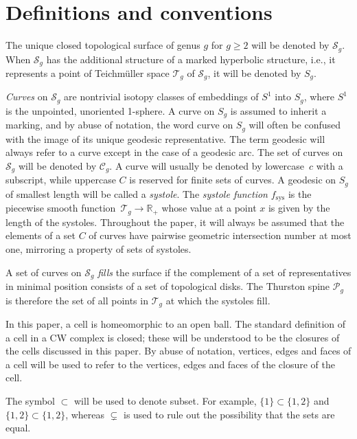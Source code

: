 \documentclass[pdftex]{sigma}
\numberwithin{equation}{section}
\begin{document}
\section{Definitions and conventions}
\label{sub:defns}

The unique closed topological surface of genus $g$ for $g\geq 2$ will be denoted by $\mathcal{S}_{g}$. When $\mathcal{S}_{g}$ has the additional structure of a marked hyperbolic structure, i.e., it represents a point of Teichm\"uller space $\mathcal{T}_{g}$ of $\mathcal{S}_{g}$, it will be denoted by $S_{g}$.

\textit{Curves} on $\mathcal{S}_{g}$ are nontrivial isotopy classes of embeddings of $S^{1}$ into $S_{g}$, where $S^{1}$ is the unpointed, unoriented 1-sphere. A curve on $S_{g}$ is assumed to inherit a marking, and by abuse of notation, the word curve on $S_{g}$ will often be confused with the image of its unique geodesic representative. The term geodesic will always refer to a curve except in the case of a geodesic arc. The set of curves on $\mathcal{S}_{g}$ will be denoted by $\mathcal{C}_{g}$. A curve will usually be denoted by lowercase~$c$ with a subscript, while uppercase $C$ is reserved for finite sets of curves. A geodesic on $S_{g}$ of smallest length will be called a \textit{systole}. The \textit{systole function} $f_{\mathrm{sys}}$ is the piecewise smooth function~${\mathcal{T}_{g}\rightarrow \mathbb{R}_{+}}$ whose value at a point $x$ is given by the length of the systoles. Throughout the paper, it will always be assumed that the elements of a set $C$ of curves have pairwise geometric intersection number at most one, mirroring a property of sets of systoles.

A set of curves on $\mathcal{S}_{g}$ \textit{fills} the surface if the complement of a set of representatives in minimal position consists of a set of topological disks. The Thurston spine $\mathcal{P}_{g}$ is therefore the set of all points in $\mathcal{T}_{g}$ at which the systoles fill.

In this paper, a cell is homeomorphic to an open ball. The standard definition of a cell in a CW complex is closed; these will be understood to be the closures of the cells discussed in this paper. By abuse of notation, vertices, edges and faces of a cell will be used to refer to the vertices, edges and faces of the closure of the cell.

The symbol $\subset$ will be used to denote subset. For example, $\{1\}\subset \{1,2\}$ and $\{1,2\}\subset \{1,2\}$, whereas $\subsetneq$ is used to rule out the possibility that the sets are equal.
\end{document}
